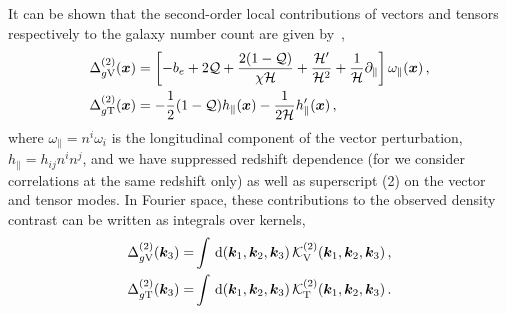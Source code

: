 It can be shown that the second-order local contributions of vectors and tensors respectively to the galaxy number count are given by~\cite{Bertacca:2014hwa}, 
\begin{align}
	&\Delta_{g\mathrm{V}}^{(2)}(\bm {x}) = \left[ -b_e + 2 \mathcal{Q} + \frac{2 (1-\mathcal{Q})}{\chi \mathcal{H}} + \frac{\mathcal{H}'}{\mathcal{H}^2}  + \frac{1}{\mathcal{H}} \partial_\parallel  \right] \omega_\parallel(\bm {x})\,,\\
	&\Delta_{g\mathrm{T}}^{(2)}(\bm {x}) = - \frac{1}{2} (1 - \mathcal{Q}) h_\parallel(\bm {x}) - \frac{1}{2\mathcal{H}} h'_\parallel(\bm {x})\,,
\end{align}
where $\omega_\parallel = n^i \omega_i$ is the longitudinal component of the vector perturbation, $h_\parallel = h_{ij} n^i n^j$, and we have suppressed redshift dependence (for we consider correlations at the same redshift only) as well as superscript (2) on the vector and tensor modes. In Fourier space, these contributions to the observed density contrast can be written as integrals over kernels, 
\begin{align}
	\Delta_{g\mathrm{V}}^{(2)}(\bm {k}_3) =& \int\,\mathrm{d}(\bm {k}_1,\bm {k}_2,\bm {k}_3)\, \mathcal{K}^{(2)}_\mathrm{V}(\bm {k}_1,\bm {k}_2,\bm {k}_3)\,,\\
	\Delta_{g\mathrm{T}}^{(2)}(\bm {k}_3) =& \int\,\mathrm{d}(\bm {k}_1,\bm {k}_2,\bm {k}_3)\, \mathcal{K}^{(2)}_\mathrm{T}(\bm {k}_1,\bm {k}_2,\bm {k}_3)\,.
\end{align}

